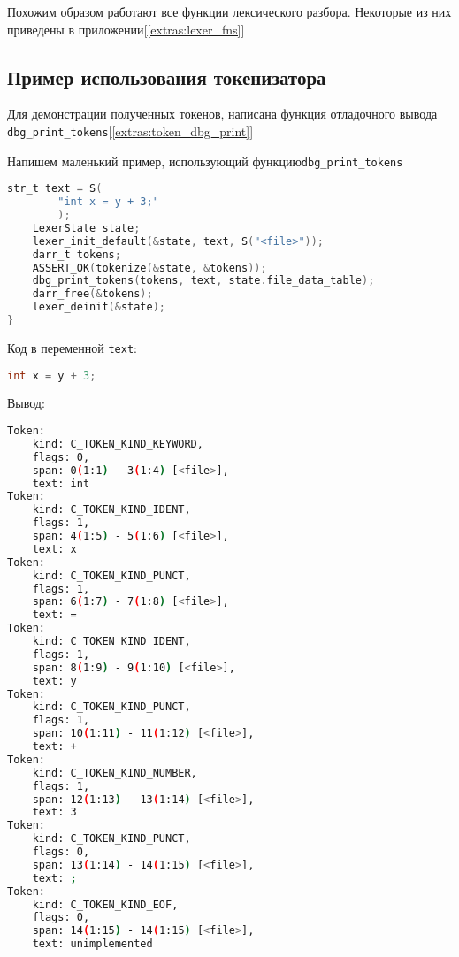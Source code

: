 Похожим образом работают все функции лексического разбора.
Некоторые из них приведены в приложении[\ref{extras:lexer_fns}]

\clearpage
\subsection{Пример использования токенизатора}

Для демонстрации полученных токенов, написана функция отладочного вывода \verb|dbg_print_tokens|[\ref{extras:token_dbg_print}]

Напишем маленький пример, использующий функцию\newline \verb|dbg_print_tokens|
\begin{lstlisting}[language=c, caption={Пример использования лексера}, label={lexing:lexer-usage-ex}]
    str_t text = S(
        "int x = y + 3;"
        );
    LexerState state;
    lexer_init_default(&state, text, S("<file>"));
    darr_t tokens;
    ASSERT_OK(tokenize(&state, &tokens));
    dbg_print_tokens(tokens, text, state.file_data_table);
    darr_free(&tokens);
    lexer_deinit(&state);
}
\end{lstlisting}

Код в переменной \verb|text|:
\begin{lstlisting}[language=c, caption={Входные данные примера}, label={lexing:usage-ex-in}]
int x = y + 3;
\end{lstlisting}

Вывод:

\begin{lstlisting}[language=bash, caption={Входные данные примера}, label={lexing:usage-ex-out}]
Token:
    kind: C_TOKEN_KIND_KEYWORD,
    flags: 0,
    span: 0(1:1) - 3(1:4) [<file>],
    text: int
Token:
    kind: C_TOKEN_KIND_IDENT,
    flags: 1,
    span: 4(1:5) - 5(1:6) [<file>],
    text: x
Token:
    kind: C_TOKEN_KIND_PUNCT,
    flags: 1,
    span: 6(1:7) - 7(1:8) [<file>],
    text: =
Token:
    kind: C_TOKEN_KIND_IDENT,
    flags: 1,
    span: 8(1:9) - 9(1:10) [<file>],
    text: y
Token:
    kind: C_TOKEN_KIND_PUNCT,
    flags: 1,
    span: 10(1:11) - 11(1:12) [<file>],
    text: +
Token:
    kind: C_TOKEN_KIND_NUMBER,
    flags: 1,
    span: 12(1:13) - 13(1:14) [<file>],
    text: 3
Token:
    kind: C_TOKEN_KIND_PUNCT,
    flags: 0,
    span: 13(1:14) - 14(1:15) [<file>],
    text: ;
Token:
    kind: C_TOKEN_KIND_EOF,
    flags: 0,
    span: 14(1:15) - 14(1:15) [<file>],
    text: unimplemented
\end{lstlisting}

